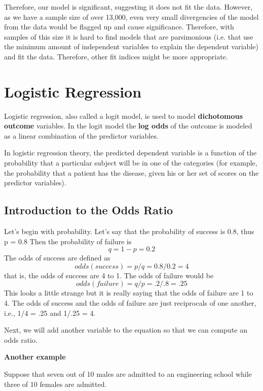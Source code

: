 \documentclass[12pt]{article}
\begin{document}
Therefore, our model is significant, suggesting it does not fit the data. However, as we have a sample size of over 13,000, even very small divergencies of the model from the data would be flagged up and cause significance. Therefore, with samples of this size it is hard to find models that are parsimonious (i.e. that use the minimum amount of independent variables to explain the dependent variable) and fit the data. Therefore, other fit indices might be more appropriate.

\section{Logistic Regression}
Logistic regression, also called a logit model, is used to model \textbf{dichotomous outcome} variables. 
In the logit model the \textbf{log odds} of the outcome is modeled as a linear combination of the predictor variables.

In logistic regression theory, the predicted dependent variable is a function of the probability that a particular subject will be in one of the categories (for example, the probability that a patient has the disease, given his or her set of scores on the predictor variables).

\subsection{Introduction to the Odds Ratio}
Let's begin with probability.  Let's say that the probability of success is 0.8, thus
p = 0.8
Then the probability of failure is
\[q = 1 - p = 0.2\]
The odds of success are defined as
\[odds(success) = p/q = 0.8/0.2 = 4\]
that is, the odds of success are 4 to 1. The odds of failure would be
\[odds(failure) = q/p = .2/.8 = .25\]
This looks a little strange but it is really saying that the odds of failure are 1 to 4.  The odds of success and the odds of failure are just reciprocals of one another, i.e., 1/4 = .25 and 1/.25 = 4. 


 Next, we will add another variable to the equation so that we can compute an odds ratio.

\textbf{Another example}

Suppose that seven out of 10 males are admitted to an engineering school while three of 10 females are admitted. 
\end{document}

